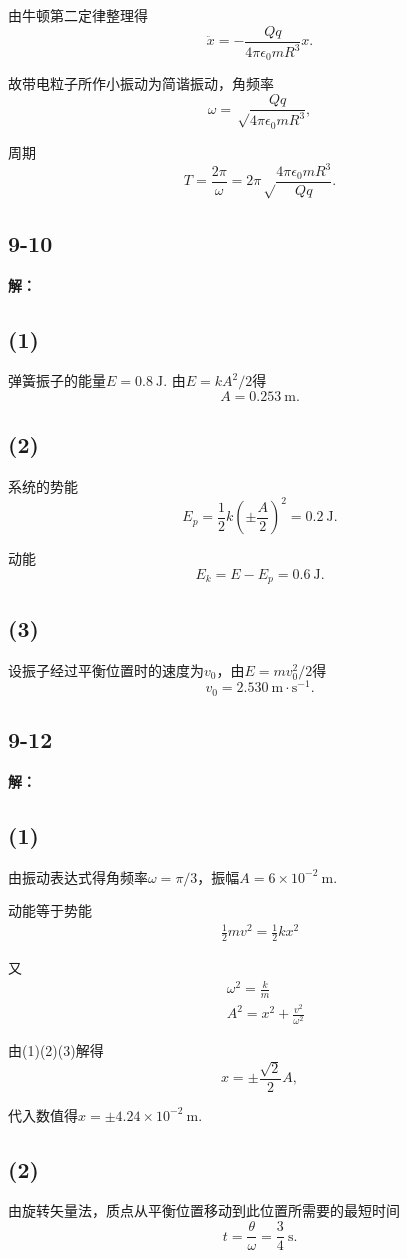 \documentclass[twocolumn]{ctexart}
\newcommand{\sol}[1]{\subsection*{#1}\noindent\textbf{解：}
	
}
\begin{document}
由牛顿第二定律整理得
$$\ddot x=-\frac{Qq}{4\pi\epsilon_0mR^3}x.$$

故带电粒子所作小振动为简谐振动，角频率
$$\omega=\sqrt\frac{Qq}{4\pi\epsilon_0mR^3},$$

周期
$$T=\frac{2\pi}{\omega}=2\pi\sqrt\frac{4\pi\epsilon_0mR^3}{Qq}.$$

\sol{9-10}
\subsection*{(1)}
弹簧振子的能量$E=0.8\ \mathrm J$. 由$E=kA^2/2$得
$$A=0.253\ \mathrm m.$$

\subsection*{(2)}
系统的势能
$$E_p=\frac{1}{2}k\left(\pm\frac{A}{2}\right)^2=0.2\ \mathrm J.$$

动能
$$E_k=E-E_p=0.6\ \mathrm J.$$

\subsection*{(3)}
设振子经过平衡位置时的速度为$v_0$，由$E=mv_0^2/2$得
$$v_0=2.530\ \mathrm{m\cdot s^{-1}}.$$

\sol{9-12}
\setcounter{equation}{0}
\subsection*{(1)}
由振动表达式得角频率$\omega=\pi/3$，振幅$A=6\times10^{-2}\ \mathrm m$.

动能等于势能
\begin{align}
	\frac{1}{2}mv^2=\frac{1}{2}kx^2
\end{align}

又
\begin{align}
	&\omega^2=\frac{k}{m}\\
	&A^2=x^2+\frac{v^2}{\omega^2}
\end{align}

由(1)(2)(3)解得
$$x=\pm\frac{\sqrt{2}}{2}A,$$

代入数值得$x=\pm4.24\times10^{-2}\ \mathrm m$.

\subsection*{(2)}

由旋转矢量法，质点从平衡位置移动到此位置所需要的最短时间
$$t=\frac{\theta}{\omega}=\frac{3}{4}\ \mathrm s.$$
\end{document}
